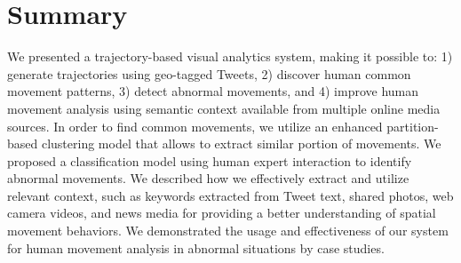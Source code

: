 \section{Summary}
We presented a trajectory-based visual analytics system, making it possible to: 1) generate trajectories using geo-tagged Tweets, 2) discover human common movement patterns, 3) detect abnormal movements, and 4) improve human movement analysis using semantic context available from multiple online media sources.
In order to find common movements, we utilize an enhanced partition-based clustering model that allows to extract similar portion of movements.
We proposed a classification model using human expert interaction to identify abnormal movements.
We described how we effectively extract and utilize relevant context, such as keywords extracted from Tweet text, shared photos, web camera videos, and news media for providing a better understanding of spatial movement behaviors.
We demonstrated the usage and effectiveness of our system for human movement analysis in abnormal situations by case studies.
